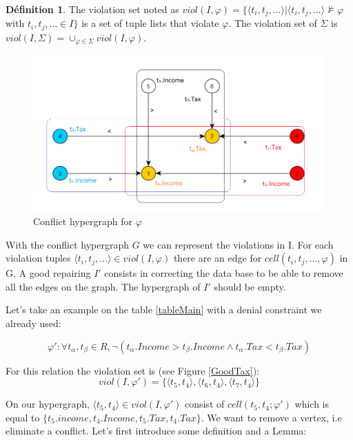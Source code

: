\documentclass[letterpaper, 12pt]{report}
\theoremstyle{definition}
\newtheorem{mydef}{Définition}
\begin{document}
\begin{mydef}
 The violation set noted as $viol(I,\varphi) = \{ \langle t_i,t_j,... \rangle | \langle t_i,t_j,... \rangle \not\models \varphi $ with $ t_i,t_j,... \in I \}$ is a set of tuple lists that violate $\varphi$. The violation set of $\Sigma$ is $viol(I,\Sigma) = \cup_{\varphi \in \Sigma}viol(I,\varphi)$.
\end{mydef}

\begin{figure}
 \centering
\hspace*{-1.8cm} \includegraphics[scale=1]{img/grapht4.png}
 \caption{\label{grapht4} Conflict hypergraph for $\varphi$}
\end{figure}

With the conflict hypergraph $G$ we can represent the violations in I. For each violation tuples $ \langle t_i,t_j,...\rangle \in viol(I,\varphi)$ there are an edge for $cell(t_i,t_j,...,\varphi)$ in G. A good repairing $I'$ consists in correcting the data base to be able to remove all the edges on the graph. The hypergraph of $I'$ should be empty.

Let's take an example on the table \ref{tableMain} with a denial constraint we already used:

$$\varphi': \forall t_\alpha,t_\beta \in R , \neg(t_\alpha.Income > t_\beta.Income \wedge t_\alpha.Tax < t_\beta.Tax)$$

For this relation the violation set is (see Figure \ref{GoodTax}):
 $$ viol(I,\varphi') = \{ \langle t_5,t_4 \rangle,\langle t_6,t_4 \rangle,\langle t_7,t_4 \rangle \}$$

On our hypergraph, $\langle t_5,t_4 \rangle \in viol(I,\varphi')$ consist of $cell(t_5,t_4;\varphi')$ which is equal to $\{ t_5.income,t_4.Income,t_5.Tax,t_4.Tax\}$. We want to remove a vertex, i.e eliminate a conflict. Let's first introduce some definition and a Lemma: \cite{main}
\end{document}
